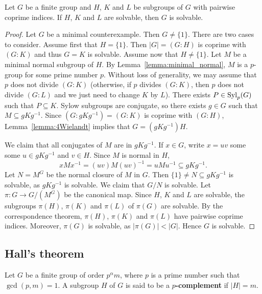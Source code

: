 \begin{theorem}[Wielandt]
	\label{theorem:Wielandt:solvable}
	Let $G$ be a finite group and $H$, $K$ and $L$ be 
        subgroups of $G$ with pairwise coprime indices. 
        If $H$, $K$ and $L$ are solvable, then $G$ is 
	solvable.
\end{theorem}

\begin{proof}
    Let $G$ be a minimal counterexample. Then $G\ne\{1\}$. 
    There are two cases to consider. 
    Assume first that $H=\{1\}$. Then 
    $|G|=(G:H)$ is coprime with $(G:K)$ and thus $G=K$ is solvable. 
    Assume now that  
    $H\ne \{1\}$. Let $M$ be a minimal normal subgroup of $H$. By Lemma~\ref{lemma:minimal_normal}, 
    $M$ is a $p$-group for some prime number $p$. 
    Without loss of generality, we may assume that $p$ does not divide $(G:K)$ (otherwise, if $p$ divides $(G:K)$, then 
    $p$ does not divide $(G:L)$ and we just need to change $K$ by $L$). 
    There exists $P\in\mathrm{Syl}_p(G)$ such that $P\subseteq K$. Sylow subgroups are conjugate, so there exists 
    $g\in G$ such that $M\subseteq
	gKg^{-1}$. Since $(G:gKg^{-1})=(G:K)$ is coprime with $(G:H)$, Lemma~\ref{lemma:4Wielandt} implies that
    $G=(gKg^{-1})H$. 
	
    We claim that all conjugates of $M$ are in $gKg^{-1}$. 
    If $x\in G$, write $x=uv$ some some $u\in 
	gKg^{-1}$ and $v\in H$. Since $M$ is normal in $H$, 
	\[
	xMx^{-1}=(uv)M(uv)^{-1}=uMu^{-1}\subseteq gKg^{-1}.
	\]
        Let $N=M^G$ be the normal closure of $M$ in $G$. 
	Then $\{1\}\ne N\subseteq gKg^{-1}$ is solvable, as $gKg^{-1}$ is 
	solvable. We claim that $G/N$ is solvable. Let 
         $\pi\colon G\to G/(M^G)$ be the canonical map. Since $H$, $K$ and $L$ are solvable, 
    the subgroups $\pi(H)$, $\pi(K)$ and $\pi(L)$ of $\pi(G)$ are solvable. By the correspondence theorem, $\pi(H)$, $\pi(K)$ and $\pi(L)$ have pairwise coprime indices. Moreover, $\pi(G)$ is solvable, as
    $|\pi(G)|<|G|$.  
        Hence 
        $G$ is solvable. 
\end{proof}

\subsection{Hall's theorem}

\begin{definition}
Let $G$ be a finite group of order $p^{\alpha}m$, where $p$ is a prime number such that 
$\gcd(p,m)=1$. A subgroup 
$H$ of $G$ is said to be a \textbf{$p$-complement} if $|H|=m$. 
\end{definition}

